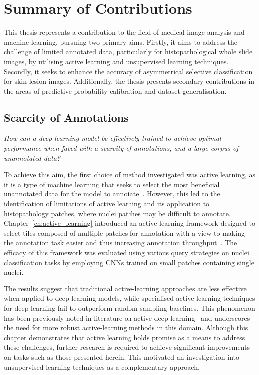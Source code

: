 \section{Summary of Contributions}
This thesis represents a contribution to the field of medical image analysis and machine learning, pursuing two primary aims. Firstly, it aims to address the challenge of limited annotated data, particularly for histopathological whole slide images, by utilising active learning and unsupervised learning techniques. Secondly, it seeks to enhance the accuracy of asymmetrical selective classification for skin lesion images. Additionally, the thesis presents secondary contributions in the areas of predictive probability calibration and dataset generalisation.

\subsection{Scarcity of Annotations}
\textit{How can a deep learning model be effectively trained to achieve optimal performance when faced with a scarcity of annotations, and a large corpus of unannotated data?}

To achieve this aim, the first choice of method investigated was active learning, as it is a type of machine learning that seeks to select the most beneficial unannotated data for the model to annotate~\citep{settles2009active}. However, this led to the identification of limitations of active learning and its application to histopathology patches, where nuclei patches may be difficult to annotate. Chapter~\ref{ch:active_learning} introduced an active-learning framework designed to select tiles composed of multiple patches for annotation with a view to making the annotation task easier and thus increasing annotation throughput~\citep{carse2019active}. The efficacy of this framework was evaluated using various query strategies on nuclei classification tasks by employing CNNs trained on small patches containing single nuclei. 

The results suggest that traditional active-learning approaches are less effective when applied to deep-learning models, while specialised active-learning techniques for deep-learning fail to outperform random sampling baselines. This phenomenon has been previously noted in literature on active deep-learning~\citep{ren2021survey} and underscores the need for more robust active-learning methods in this domain. Although this chapter demonstrates that active learning holds promise as a means to address these challenges, further research is required to achieve significant improvements on tasks such as those presented herein. This motivated an investigation into unsupervised learning techniques as a complementary approach.

